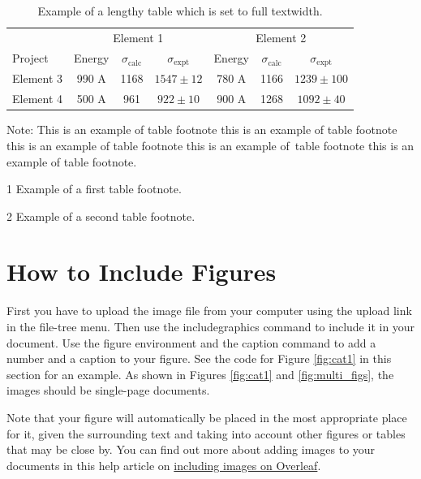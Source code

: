 \documentclass[12pt,a4paper]{article}
\begin{document}
\begin{table}[!ht]
\caption{Example of a lengthy table which is set to full textwidth.\label{tab2}}
\tabcolsep=0pt
\begin{threeparttable}
\begin{tabular*}{\textwidth}{@{\extracolsep{\fill}}lcccccc@{\extracolsep{\fill}}}
\toprule
& \multicolumn{3}{c}{Element 1\tnote{1}} & \multicolumn{3}{c}{Element 2\tnote{2}} \\
\cmidrule(lr){2-4}\cmidrule(lr){5-7}
Project & Energy & $\sigma_{\mathrm{calc}}$ & $\sigma_{\mathrm{expt}}$ & Energy & $\sigma_{\mathrm{calc}}$ & $\sigma_{\mathrm{expt}}$ \\
\midrule
Element 3 & 990 A & 1168 & $1547\pm12$ & 780 A & 1166 & $1239\pm100$ \\
Element 4 & 500 A & 961 & $922\pm10$ & 900 A & 1268 & $1092\pm40$ \\
\bottomrule
\end{tabular*}
\begin{tablenotes}
\item Note: This is an example of table footnote this is an example of table footnote this is an example of table footnote this is an example of~table footnote this is an example of table footnote.
\item[1] Example of a first table footnote.
\item[2] Example of a second table footnote.
\end{tablenotes}
\end{threeparttable}
\end{table}


\section{How to Include Figures}\label{sec6}

First you have to upload the image file from your computer using the upload link in the file-tree menu. Then use the includegraphics command to include it in your document. Use the figure environment and the caption command to add a number and a caption to your figure. See the code for Figure \ref{fig:cat1} in this section for an example. As shown in Figures \ref{fig:cat1} and \ref{fig:multi_figs}, the images should be single-page documents. 

Note that your figure will automatically be placed in the most appropriate place for it, given the surrounding text and taking into account other figures or tables that may be close by. You can find out more about adding images to your documents in this help article on \href{https://www.overleaf.com/learn/how-to/Including_images_on_Overleaf}{including images on Overleaf}.
\end{document}
